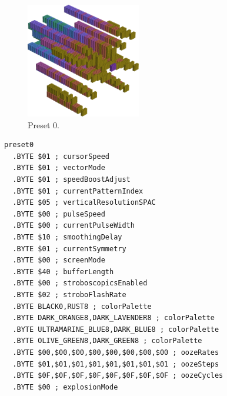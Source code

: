 \clearpage
\begin{minipage}[b]{0.48\linewidth}
\begin{figure}[H]                                                          
  \centering                                                             
  \begin{adjustbox}{width=5cm,center}                                   
  \includegraphics[width=5cm]{src/colorspace_presets/preset0-45.png}%
  \end{adjustbox}                                                        
\caption*{Preset 0.}                                           
\end{figure}                                                               
\end{minipage}
\hspace{0.1cm}
\begin{minipage}[b]{0.48\linewidth}                            
\begin{lstlisting}[basicstyle=\ttfamily\tiny]
preset0
  .BYTE $01 ; cursorSpeed
  .BYTE $01 ; vectorMode
  .BYTE $01 ; speedBoostAdjust
  .BYTE $01 ; currentPatternIndex
  .BYTE $05 ; verticalResolutionSPAC
  .BYTE $00 ; pulseSpeed
  .BYTE $00 ; currentPulseWidth
  .BYTE $10 ; smoothingDelay
  .BYTE $01 ; currentSymmetry
  .BYTE $00 ; screenMode
  .BYTE $40 ; bufferLength
  .BYTE $00 ; stroboscopicsEnabled
  .BYTE $02 ; stroboFlashRate
  .BYTE BLACK0,RUST8 ; colorPalette
  .BYTE DARK_ORANGE8,DARK_LAVENDER8 ; colorPalette
  .BYTE ULTRAMARINE_BLUE8,DARK_BLUE8 ; colorPalette
  .BYTE OLIVE_GREEN8,DARK_GREEN8 ; colorPalette
  .BYTE $00,$00,$00,$00,$00,$00,$00,$00 ; oozeRates
  .BYTE $01,$01,$01,$01,$01,$01,$01,$01 ; oozeSteps
  .BYTE $0F,$0F,$0F,$0F,$0F,$0F,$0F,$0F ; oozeCycles
  .BYTE $00 ; explosionMode
\end{lstlisting}
\end{minipage}

\vspace{0.3cm}


